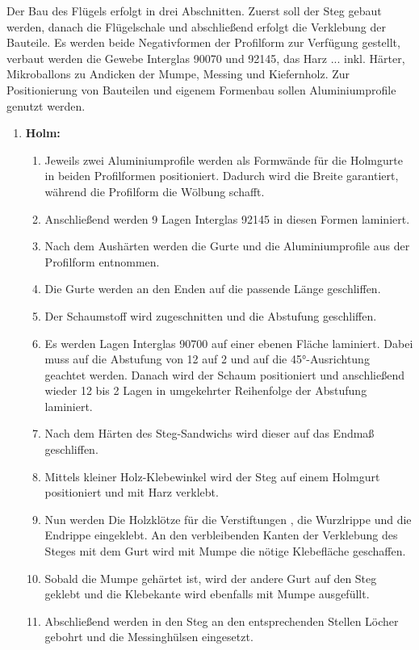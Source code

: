 Der Bau des Flügels erfolgt in drei Abschnitten. Zuerst soll der Steg gebaut werden, danach die Flügelschale und abschließend erfolgt die Verklebung der Bauteile.
Es werden beide Negativformen der Profilform zur Verfügung gestellt, verbaut werden die Gewebe Interglas 90070 und 92145, das Harz ... inkl. Härter, Mikroballons zu Andicken der Mumpe, Messing und Kiefernholz. Zur Positionierung von Bauteilen und eigenem Formenbau sollen Aluminiumprofile genutzt werden.

\begin{enumerate}
	\item \textbf{Holm:}
	\begin{enumerate}
		\item Jeweils zwei Aluminiumprofile werden als Formwände für die Holmgurte in beiden Profilformen positioniert. Dadurch wird die Breite garantiert, während die Profilform die Wölbung schafft.
		\item Anschließend werden 9 Lagen Interglas 92145 in diesen Formen laminiert. 
		\item Nach dem Aushärten werden die Gurte und die Aluminiumprofile aus der Profilform entnommen. 
		\item Die Gurte werden an den Enden auf die passende Länge geschliffen.
		\item Der Schaumstoff wird zugeschnitten und die Abstufung geschliffen.
		\item Es werden Lagen Interglas 90700 auf einer ebenen Fläche laminiert. Dabei muss auf die Abstufung von 12 auf 2 und auf die 45°-Ausrichtung geachtet werden. Danach wird der Schaum positioniert und anschließend wieder 12 bis 2 Lagen in umgekehrter Reihenfolge der Abstufung laminiert.
		\item Nach dem Härten des Steg-Sandwichs wird dieser auf das Endmaß geschliffen.
		\item Mittels kleiner Holz-Klebewinkel wird der Steg auf einem Holmgurt positioniert und mit Harz verklebt.
		\item Nun werden Die Holzklötze für die Verstiftungen , die Wurzlrippe und die Endrippe eingeklebt. An den verbleibenden Kanten der Verklebung des Steges mit dem Gurt wird mit Mumpe die nötige Klebefläche geschaffen.
		\item Sobald die Mumpe gehärtet ist, wird der andere Gurt auf den Steg geklebt und die Klebekante wird ebenfalls mit Mumpe ausgefüllt.
		\item Abschließend werden in den Steg an den entsprechenden Stellen Löcher gebohrt und die Messinghülsen eingesetzt.

\end{enumerate}
\end{enumerate}
